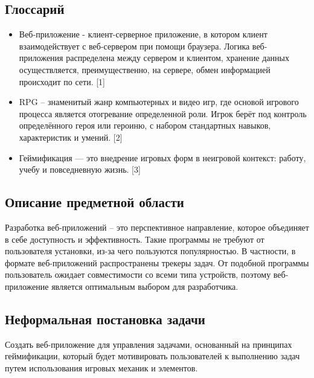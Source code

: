 \documentclass[../document.tex]{subfiles}
\begin{document}
\subsection{Глоссарий}
\begin{itemize}
    \item Веб-приложение - клиент-серверное приложение, в котором клиент взаимодействует с веб-сервером при помощи браузера. Логика веб-приложения распределена между сервером и клиентом, хранение данных осуществляется, преимущественно, на сервере, обмен информацией происходит по сети. [1]
    \item RPG – знаменитый жанр компьютерных и видео игр, где основой игрового процесса является отогревание определенной роли. Игрок берёт под контроль определённого героя или героиню, с набором стандартных навыков, характеристик и умений. [2]
    \item Геймификация — это внедрение игровых форм в неигровой контекст: работу, учебу и повседневную жизнь. [3]
\end{itemize}
\subsection{Описание предметной области}
\par Разработка веб-приложений – это перспективное направление, которое объединяет в себе доступность и эффективность. Такие программы не требуют от пользователя установки, из-за чего пользуются популярностью. В частности, в формате веб-приложений распространены трекеры задач. От подобной программы пользователь ожидает совместимости со всеми типа устройств, поэтому веб-приложение является оптимальным выбором для разработчика.
\subsection{Неформальная постановка задачи}
\par Создать веб-приложение для управления задачами, основанный на принципах геймификации, который будет мотивировать пользователей к выполнению задач путем использования игровых механик и элементов.
\end{document}
